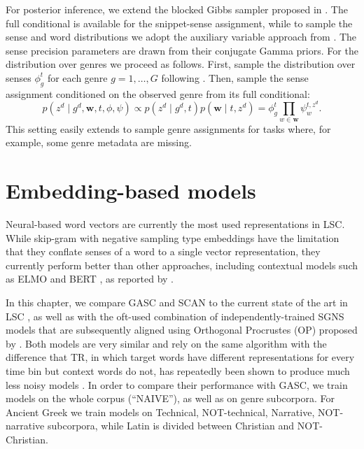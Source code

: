 \documentclass[output=paper%
]{langscibook}
\begin{document}
For posterior inference, we extend the blocked Gibbs sampler proposed in \citet{frermann-lapata-2016-bayesian}. The full conditional is available for the snippet-sense assignment, while  to  sample  the  sense and word distributions we adopt the auxiliary variable approach from \citet{mimno2008}. The sense precision parameters are drawn from their conjugate Gamma priors. For the distribution over genres we proceed as follows. First, sample the distribution over senses $\phi^t_g$ for each genre $g=1,\dots,G$ following \citet{mimno2008}. Then, sample the sense assignment conditioned on the observed genre from its full conditional:
\[p(z^d \mid g^d, \textbf{w}, t, \phi, \psi) \propto p(z^d \mid g^d, t) p( \textbf{w} \mid t, z^d) = \phi^t_{g} \prod_{w \in \textbf{w}} \psi^{t,z^d}_w.\]
This  setting easily extends to sample genre assignments for tasks where, for example, some genre metadata are missing.



\section{Embedding-based models}\largerpage
\label{sec:embedding}

Neural-based word vectors are currently the most used representations in LSC.
While skip-gram with negative sampling \citep[SGNS,][]{mikolov2013efficient} type embeddings have the limitation that they conflate senses of a word to a single vector representation, they currently perform better than other approaches, including contextual models such as ELMO \citep{peters-etal-2018-deep} and BERT \citep{devlin-etal-2019-bert}, as reported by \citet{schlechtweg-etal-2020-semeval}.

In this chapter, we compare GASC and SCAN to the current state of the art in LSC \citep[temporal referencing (TR),][]{dubossarsky-etal-2019-time}, as well as with the oft-used combination of independently-trained SGNS models that are subsequently aligned using Orthogonal Procrustes (OP) proposed by \citet{hamilton-etal-2016-diachronic}.
Both models are very similar and rely on the same algorithm with the difference that TR, in which target words have different representations for every time bin but context words do not, has repeatedly been shown to produce much less noisy models \citep[e.g. in][]{cassotti-etal-2020-gmctsc,zamora-reina-etal-2020-dcc-uchile}.
In order to compare their performance with GASC, we train models on the whole corpus (``NAIVE''), as well as on genre subcorpora. For Ancient Greek we train models on Technical, NOT-technical, Narrative, NOT-narrative subcorpora, while Latin is divided between Christian and NOT-Christian.
\end{document}
